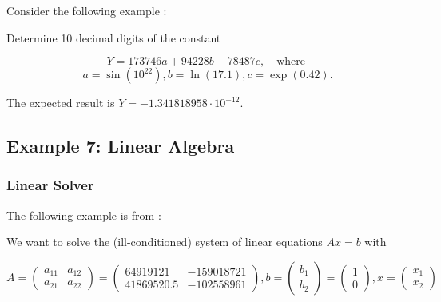 Consider the following example \citep{Ghazi2010} : 

Determine 10 decimal digits of the constant

\begin{equation}
Y = 173746a + 94228b - 78487c, \quad \text{where } 
\end{equation}
\begin{equation}
a = \sin(10^{22}), b = \ln(17.1), c = \exp(0.42). 
\end{equation}

The expected result is $Y = -1.341818958 \cdot 10^{-12}$.





\subsection{Example 7: Linear Algebra}

\subsubsection{Linear Solver}
The following example is from \cite{Hofschuster2004}:

We want to solve the (ill-conditioned) system of linear equations $Ax = b$ with

\begin{equation}
A = \begin{pmatrix}
a_{11} & a_{12} \\
a_{21} & a_{22} 
\end{pmatrix}  = \begin{pmatrix}
64919121 & -159018721 \\
41869520.5 & -102558961 
\end{pmatrix}, b = \begin{pmatrix}
b_{1} \\
b_{2} 
\end{pmatrix}
= \begin{pmatrix}
1 \\
0
\end{pmatrix} , x = \begin{pmatrix}
x_{1} \\
x_{2} 
\end{pmatrix}
\end{equation}

